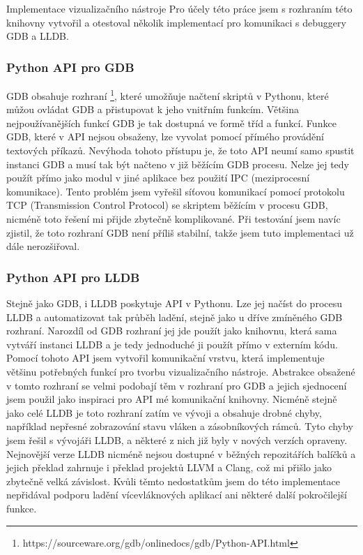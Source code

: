 \documentclass[czech,bachelor,male,python,dept460]{diploma}						%
\begin{document}
\begin{section}{Implementace vizualizačního nástroje}
		Pro účely této práce jsem s rozhraním této knihovny vytvořil a otestoval několik implementací pro komunikaci s debuggery GDB a LLDB.

		\subsubsection{Python API pro GDB}
		\label{ref:GdbPythonApi}
		GDB obsahuje rozhraní \footnote{https://sourceware.org/gdb/onlinedocs/gdb/Python-API.html}, které umožňuje načtení skriptů v Pythonu, které
		můžou ovládat GDB a přistupovat k jeho vnitřním funkcím. Většina nejpoužívanějších funkcí GDB je tak dostupná ve formě tříd a funkcí.
		Funkce GDB, které v API nejsou obsaženy, lze vyvolat pomocí přímého provádění textových příkazů.
		Nevýhoda tohoto přístupu je, že toto API neumí samo spustit instanci GDB a musí tak být načteno v již běžícím GDB procesu.
		Nelze jej tedy použít přímo jako modul v jiné aplikace bez použití IPC (meziprocesní komunikace).
		Tento problém jsem vyřešil síťovou komunikací pomocí protokolu TCP (Transmission Control Protocol) se skriptem běžícím v procesu GDB, nicméně
		toto řešení mi přijde zbytečně komplikované. Při testování jsem navíc zjistil, že toto rozhraní GDB není příliš stabilní, takže jsem tuto implementaci
		už dále nerozšiřoval.
		
		\subsubsection{Python API pro LLDB}
		Stejně jako GDB, i LLDB poskytuje API v Pythonu. Lze jej načíst do procesu LLDB a automatizovat tak průběh ladění, stejně jako u dříve zmíněného GDB
		rozhraní. Narozdíl od GDB rozhraní jej jde použít jako knihovnu, která sama vytváří instanci LLDB a je tedy jednoduché ji použít přímo v externím kódu.
		Pomocí tohoto API jsem vytvořil komunikační vrstvu, která implementuje většinu potřebných funkcí pro tvorbu vizualizačního nástroje.
		Abstrakce obsažené v tomto rozhraní se velmi podobají těm v rozhraní pro GDB a jejich sjednocení jsem použil jako inspiraci pro API mé komunikační knihovny.
		Nicméně stejně jako celé LLDB je toto rozhraní zatím ve vývoji a obsahuje drobné chyby, například nepřesné zobrazování stavu vláken a zásobníkových rámců.
		Tyto chyby jsem řešil s vývojáři LLDB, a některé z nich již byly v nových verzích opraveny. Nejnovější verze LLDB nicméně nejsou dostupné v běžných
		repozitářích balíčků a jejich překlad zahrnuje i překlad projektů LLVM a Clang, což mi přišlo jako zbytečně velká závislost.
		Kvůli těmto nedostatkům jsem do této implementace nepřidával podporu ladění vícevláknových aplikací ani některé další pokročilejší funkce.
		

\end{section}
\end{document}
